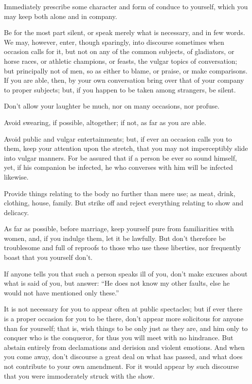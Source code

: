 Immediately prescribe some character and form of conduce to yourself,
which you may keep both alone and in company. 

Be for the most part silent, or speak merely what is necessary, and
in few words. We may, however, enter, though sparingly, into discourse
sometimes when occasion calls for it, but not on any of the common
subjects, of gladiators, or horse races, or athletic champions, or
feasts, the vulgar topics of conversation; but principally not of
men, so as either to blame, or praise, or make comparisons. If you
are able, then, by your own conversation bring over that of your company
to proper subjects; but, if you happen to be taken among strangers,
be silent. 

Don't allow your laughter be much, nor on many occasions, nor profuse.

Avoid swearing, if possible, altogether; if not, as far as you are
able. 

Avoid public and vulgar entertainments; but, if ever an occasion calls
you to them, keep your attention upon the stretch, that you may not
imperceptibly slide into vulgar manners. For be assured that if a
person be ever so sound himself, yet, if his companion be infected,
he who converses with him will be infected likewise. 

Provide things relating to the body no further than mere use; as meat,
drink, clothing, house, family. But strike off and reject everything
relating to show and delicacy. 

As far as possible, before marriage, keep yourself pure from familiarities
with women, and, if you indulge them, let it be lawfully. But don't
therefore be troublesome and full of reproofs to those who use these
liberties, nor frequently boast that you yourself don't.

If anyone tells you that such a person speaks ill of you, don't make
excuses about what is said of you, but answer: ``He does not know
my other faults, else he would not have mentioned only these.''

It is not necessary for you to appear often at public spectacles;
but if ever there is a proper occasion for you to be there, don't
appear more solicitous for anyone than for yourself; that is, wish
things to be only just as they are, and him only to conquer who is
the conqueror, for thus you will meet with no hindrance. But abstain
entirely from declamations and derision and violent emotions. And
when you come away, don't discourse a great deal on what has passed,
and what does not contribute to your own amendment. For it would appear
by such discourse that you were immoderately struck with the show.

